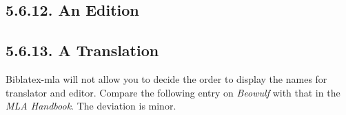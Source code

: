 \documentclass[12pt]{article}
\begin{document}
\printbibliography[heading=blank,segment=11]


\subsection*{5.6.12. An Edition}
\newrefsegment

\nocite{crane75ab}\nocite{crane75aa}\nocite{twain93aa}\nocite{smith02aa}\nocite{shakespeare92aa}\nocite{octovian86aa}\nocite{edgeworth92aa}\nocite{austen01aa}

\printbibliography[heading=blank,segment=12]


\subsection*{5.6.13. A Translation}
\newrefsegment
Biblatex-mla will not allow you to decide the order to display the names for translator and editor.  Compare the following entry on \emph{Beowulf} with that in the \emph{MLA Handbook}.  The deviation is minor.

\nocite{mu76aa}\nocite{hildegard-of-bingen01aa}\nocite{esquivel92aa}\nocite{beowulf01aa}\nocite{levi87aa}\nocite{esquivel92ab}

\printbibliography[heading=blank,segment=13]

\end{document}
